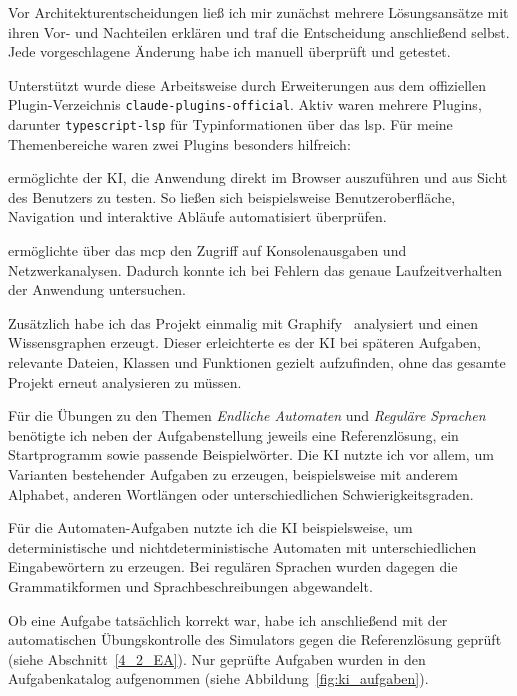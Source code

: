 Vor Architekturentscheidungen ließ ich mir zunächst mehrere Lösungsansätze mit ihren
Vor- und Nachteilen erklären und traf die Entscheidung anschließend selbst.
Jede vorgeschlagene Änderung habe ich manuell überprüft und getestet.

Unterstützt wurde diese Arbeitsweise durch Erweiterungen aus dem offiziellen
Plugin-Verzeichnis \texttt{claude-\allowbreak plugins-\allowbreak official}.
Aktiv waren mehrere Plugins, darunter \texttt{typescript-lsp} für Typinformationen über das
\gls{lsp}.
Für meine Themenbereiche waren zwei Plugins besonders hilfreich:

\begin{description}[leftmargin=*,style=nextline,itemsep=0.75ex]
\item[\texttt{playwright}]
ermöglichte der KI, die Anwendung direkt im Browser auszuführen und aus Sicht 
des Benutzers zu testen.
So ließen sich beispielsweise Benutzeroberfläche, Navigation und interaktive Abläufe automatisiert
überprüfen.

\item[\texttt{chrome-devtools-mcp}]
ermöglichte über das \gls{mcp} den Zugriff auf Konsolenausgaben und Netzwerkanalysen. 
Dadurch konnte ich bei Fehlern das genaue Laufzeitverhalten der Anwendung untersuchen.
\end{description}

Zusätzlich habe ich das Projekt einmalig mit Graphify~\cite{shamsi2026graphify}
analysiert und einen Wissensgraphen erzeugt.
Dieser erleichterte es der KI bei späteren Aufgaben, 
relevante Dateien, Klassen und Funktionen gezielt aufzufinden, 
ohne das gesamte Projekt erneut analysieren zu müssen.


Für die Übungen zu den Themen \emph{Endliche Automaten} und \emph{Reguläre Sprachen}
benötigte ich neben der Aufgabenstellung jeweils eine Referenzlösung, ein Startprogramm
sowie passende Beispielwörter.
Die KI nutzte ich vor allem, um Varianten bestehender Aufgaben zu erzeugen,
beispielsweise mit anderem Alphabet, anderen Wortlängen oder unterschiedlichen
Schwierigkeitsgraden.

Für die Automaten-Aufgaben nutzte ich die KI beispielsweise, um deterministische und 
nichtdeterministische Automaten mit unterschiedlichen Eingabewörtern zu erzeugen.
Bei regulären Sprachen wurden dagegen die Grammatikformen und Sprachbeschreibungen abgewandelt.

Ob eine Aufgabe tatsächlich korrekt war, habe ich anschließend mit der automatischen
Übungskontrolle des Simulators gegen die Referenzlösung geprüft
(siehe Abschnitt~\ref{4_2_EA}).
Nur geprüfte Aufgaben wurden in den Aufgabenkatalog aufgenommen
(siehe Abbildung~\ref{fig:ki_aufgaben}).

